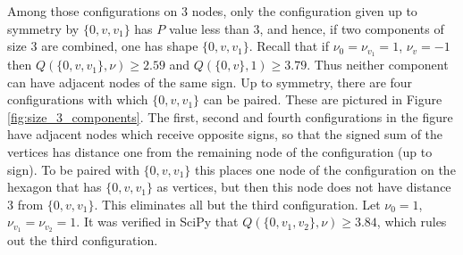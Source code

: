 \documentclass[a4paper, 12pt, notitlepage]{amsart}
\theoremstyle{remark}
\begin{document}
 
 Among those configurations on 3 nodes, only the configuration given up to symmetry by $\{0, v, v_1\}$ has $P$ value less than 3, and hence, if two components of size 3 are combined, one has shape $\{0, v, v_1\}$.  Recall that if $\nu_0 = \nu_{v_1} = 1$, $\nu_v = -1$ then $Q(\{0, v, v_1\}, \nu) \geq 2.59$ and $Q(\{0, v\}, 1) \geq 3.79$. Thus neither component can have adjacent nodes of the same sign. Up to symmetry, there are four configurations with which $\{0, v, v_1\}$ can be paired.  These are pictured in Figure \ref{fig:size_3_components}. The first, second and fourth configurations in the figure have adjacent nodes which receive opposite signs, so that the signed sum of the vertices has distance one from the remaining node of the configuration (up to sign).  To be paired with $\{0, v, v_1\}$ this places one node of the configuration on the hexagon that has $\{0, v, v_1\}$ as vertices, but then this node does not have distance 3 from $\{0, v, v_1\}$.  This eliminates all but the third configuration. Let $\nu_0 = 1$, $\nu_{v_1} = \nu_{v_2} = 1$.  It was verified in SciPy that $Q(\{0, v_1, v_2\}, \nu) \geq 3.84$, which rules out the third configuration.
 
\end{document}
